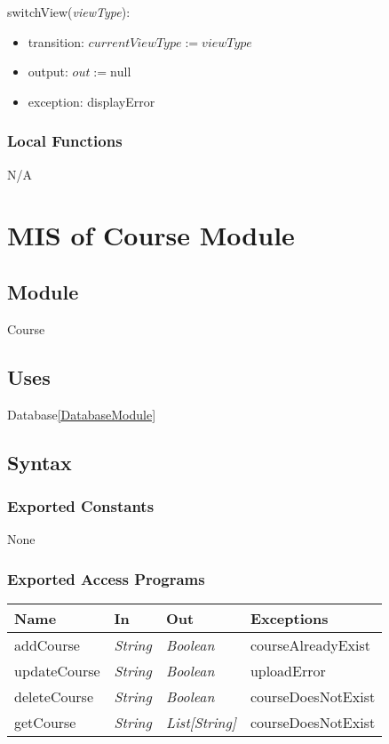 \documentclass[12pt, titlepage]{article}
\begin{document}
\noindent switchView(\textit{viewType}):
\begin{itemize}
\item transition: \( currentViewType := \textit{viewType} \)
\item output: \( out := \text{null} \)
\item exception: displayError
\end{itemize}

\subsubsection{Local Functions}
N/A


\newpage
\section{MIS of Course Module} \label{CourseModule}

\subsection{Module}
Course

\subsection{Uses}
Database\ref{DatabaseModule}
\
\subsection{Syntax}

\subsubsection{Exported Constants}
None

\subsubsection{Exported Access Programs}

\begin{center}
\begin{tabular}{p{4cm} p{3cm} p{3cm} p{3cm}}
\hline
\textbf{Name} & \textbf{In} & \textbf{Out} & \textbf{Exceptions} \\
\hline
addCourse&  \textit{String} & \textit{Boolean} & courseAlreadyExist \\
updateCourse&  \textit{String} & \textit{Boolean} & uploadError \\
deleteCourse&  \textit{String} & \textit{Boolean} & courseDoesNotExist \\
getCourse&  \textit{String} & \textit{List[String]} & courseDoesNotExist \\

\hline
\end{tabular}
\end{center}
\end{document}
